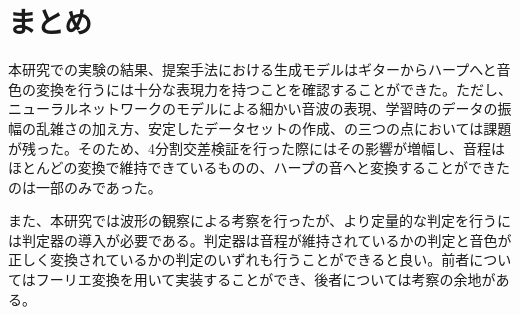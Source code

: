 \chapter{まとめ}

本研究での実験の結果、提案手法における生成モデルはギターからハープへと音色の変換を行うには十分な表現力を持つことを確認することができた。ただし、ニューラルネットワークのモデルによる細かい音波の表現、学習時のデータの振幅の乱雑さの加え方、安定したデータセットの作成、の三つの点においては課題が残った。そのため、4分割交差検証を行った際にはその影響が増幅し、音程はほとんどの変換で維持できているものの、ハープの音へと変換することができたのは一部のみであった。

また、本研究では波形の観察による考察を行ったが、より定量的な判定を行うには判定器の導入が必要である。判定器は音程が維持されているかの判定と音色が正しく変換されているかの判定のいずれも行うことができると良い。前者についてはフーリエ変換を用いて実装することができ、後者については考察の余地がある。
